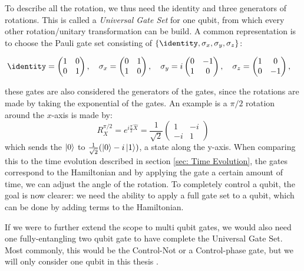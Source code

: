 To describe all the rotation, we thus need the identity and three generators of rotations. This is called a \textit{Universal Gate Set} for one qubit, from which every other rotation/unitary transformation can be build. A common representation is to choose the Pauli gate set consisting of $\{\identity, \sigma_x, \sigma_y, \sigma_z\}$:
\begin{fullwidth}
\begin{equation}
    \identity = \begin{pmatrix}
        1 & 0 \\ 
        0 & 1
    \end{pmatrix}, \quad
    \sigma_x = \begin{pmatrix}
        0 & 1 \\ 
        1 & 0
    \end{pmatrix}, \quad
    \sigma_y = i\begin{pmatrix}
        0 & -1 \\ 
        1 & 0
    \end{pmatrix}, \quad
    \sigma_z = \begin{pmatrix}
        1 & 0 \\ 
        0 & -1
    \end{pmatrix}, \quad
\end{equation}
\end{fullwidth}
these gates are also considered the generators of the gates, since the rotations are made by taking the exponential of the gates. An example is a $\pi/2$ rotation around the $x$-axis is made by:
\begin{equation}
    R_X^{\pi/2} = e^{i \frac{\pi}{2} \hat{X}} = \frac{1}{\sqrt{2}}\begin{pmatrix}
        1  & -i \\
        -i & 1
    \end{pmatrix} 
\end{equation}
which sends the $\ket{0}$ to $\frac{1}{\sqrt{2}}(\ket{0} - i\ket{1})$, a state along the y-axis. 
When comparing this to the time evolution described in section \ref{sec: Time Evolution}, the gates correspond to the Hamiltonian and by applying the gate a certain amount of time, we can adjust the angle of the rotation. To completely control a qubit, the goal is now clearer: we need the ability to apply a full gate set to a qubit, which can be done by adding terms to the Hamiltonian. 

If we were to further extend the scope to multi qubit gates, we would also need one fully-entangling two qubit gate to have complete the Universal Gate Set. Most commonly, this would be the Control-Not or a Control-phase gate, but we will only consider one qubit in this thesis \cite{krantz_quantum_2019}.


